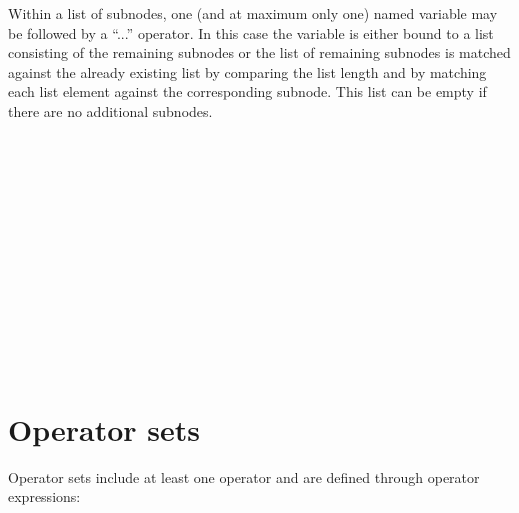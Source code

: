Within a list of subnodes, one (and at maximum only one) named variable
may be followed by a ``...'' operator. In this case the variable is
either bound to a list consisting of the remaining subnodes or the list
of remaining subnodes is matched against the already existing list by
comparing the list length and by matching each list element against the
corresponding subnode. This list can be empty if there are no additional
subnodes.

\begin{grammar}
      \produces \lextoken{(}  \lextoken{)} \\
      \produces \lextoken{(} 
	  \lextoken{)} \\
      \produces \lextoken{(} 
	 \lextoken{*} \lextoken{)} \\
      \produces {} \\
      \produces {}  \\
      \produces {} \\
      \produces {} \\
      \produces {} \\
      \produces {} \\
      \produces {}  \\
      \produces {} \\
      \produces {} 
          \\
\end{grammar}

\section{Operator sets}\label{opexpr}

Operator sets include at least one operator and are defined
through operator expressions:

\begin{grammar}
      \produces {} \\
      \produces {} \\
      \produces \lextoken{\leftbracketSY}
	  \lextoken{\rightbracketSY} \\
      \produces {} \\
      \produces {}  \\
      \produces {} \\
      \produces {} \\
\end{grammar}

